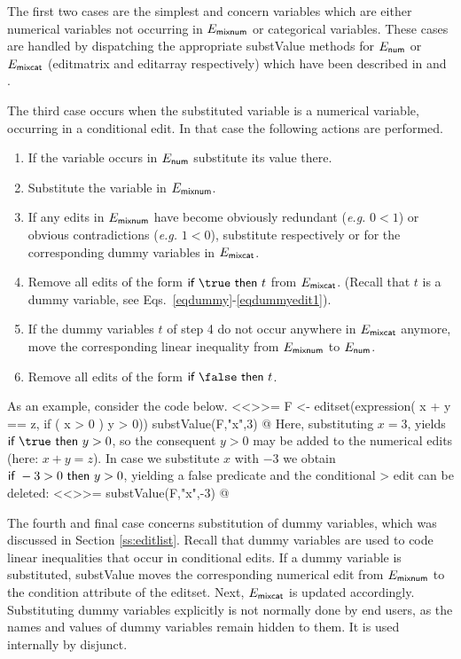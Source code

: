 \documentclass[11pt,fleqn,a4paper]{article}
\begin{document}
The first two cases are the simplest and concern variables which are either
numerical variables not occurring in $E_{\sf mixnum}$ or categorical variables. These
cases are handled by dispatching the appropriate {\sf substValue} methods for
$E_{\sf num}$ or $E_{\sf mixcat}$ ({\sf editmatrix} and {\sf editarray}
respectively) which have been described in \cite{jonge:2011} and
\cite{loo:2011b}.

The third case occurs when the substituted variable is a numerical variable,
occurring in a conditional edit. In that case
the following actions are performed.
%
\begin{enumerate}
\item If the variable occurs in $E_{\sf num}$ substitute its value there.
\item Substitute the variable in $E_{\sf mixnum}$.
\item If any edits in $E_{\sf mixnum}$ have become obviously redundant ({\em e.g.} $0 < 1$) or
obvious contradictions ({\em e.g.} $1 < 0$), substitute respectively \true or \false for
the corresponding dummy variables in $E_{\sf mixcat}$.
\item Remove all edits of the form $\textrm{\sf if } \true \textrm{ \sf then  } t$
from $E_{\sf mixcat}$. (Recall that $t$ is a dummy variable, see Eqs.\ \eqref{eqdummy}-\eqref{eqdummyedit1}).
\item If the dummy variables $t$ of step 4 do not occur anywhere in $E_{\sf
mixcat}$ anymore, move the corresponding linear inequality from $E_{\sf mixnum}$ to $E_{\sf num}$.
\item Remove all edits of the form $\textrm{\sf if } \false \textrm{ \sf then  } t$.

\end{enumerate}
%
%
As an example, consider the code below.
<<>>=
F <- editset(expression(
x + y == z,
if ( x > 0 ) y > 0))
substValue(F,"x",3)
@
Here, substituting $x=3$, yields $\textrm{\sf  if } \true \textrm{ \sf  then }
y>0$, so the consequent $y>0$ may be added to the numerical edits (here:
$x+y=z$).  In case we substitute $x$ with $-3$ we obtain $\textrm{\sf  if } -3
> 0 \textrm{ \sf  then } y>0$, yielding a false predicate and the conditional
> edit can be deleted:
<<>>=
substValue(F,"x",-3)
@

The fourth and final case concerns substitution of dummy variables, which was
discussed in Section \ref{ss:editlist}.  Recall that dummy variables are used
to code linear inequalities that occur in conditional edits. If a dummy
variable is substituted, {\sf substValue} moves the corresponding numerical
edit from $E_{\sf mixnum}$ to the {\sf condition} attribute of the {\sf
editset}. Next, $E_{\sf mixcat}$ is updated accordingly.  Substituting dummy
variables explicitly is not normally done by end users, as the names and values
of dummy variables remain hidden to them.  It is used internally by {\sf
disjunct}. 
\end{document}
